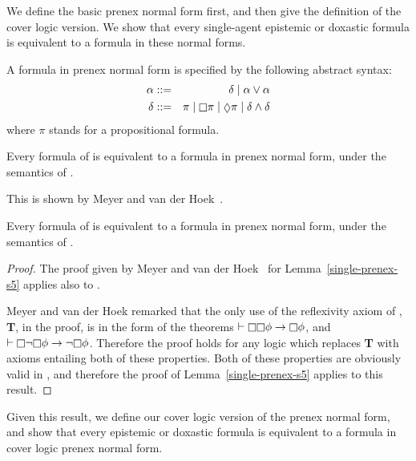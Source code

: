 We define the basic prenex normal form first, and then give the definition of
the cover logic version. We show that every single-agent epistemic or doxastic
formula is equivalent to a formula in these normal forms.

\begin{definition}
A formula in prenex normal form is specified by the following abstract syntax: 
\begin{eqnarray*}
\alpha &::=& \delta \bnfalt \alpha \lor \alpha\\
\delta &::=&    \pi \bnfalt
                \knows \pi \bnfalt
                \suspects \pi \bnfalt
                \delta \land \delta
\end{eqnarray*}
where $\pi$ stands for a propositional formula.
\end{definition}

\begin{lemma}\label{single-prenex-s5}
Every formula of \langi{} is equivalent to a formula in prenex normal form, under
the semantics of \logicSi{}.
\end{lemma}

This is shown by Meyer and van der Hoek~\cite{meyer2004epistemic}.

\begin{lemma}\label{single-prenex-kd45}
Every formula of \langi{} is equivalent to a formula in prenex normal form, under
the semantics of \logicKDi{}.
\end{lemma}

\begin{proof}
The proof given by Meyer and van der Hoek~\cite{meyer2004epistemic} for
Lemma~\ref{single-prenex-s5} applies also to \logicKDi{}.

Meyer and van der Hoek remarked that the only use of the reflexivity axiom of
\logicS{}, {\bf T}, in the proof, is in the form of the theorems $\proves \knows
\knows \phi \implies \knows \phi$, and $\proves \knows \neg \knows \phi \implies
\neg \knows \phi$. Therefore the proof holds for any logic which replaces {\bf
T} with axioms entailing both of these properties. Both of these properties are
obviously valid in \logicKDi{}, and therefore the proof of
Lemma~\ref{single-prenex-s5} applies to this result.
\end{proof}

Given this result, we define our cover logic version of the prenex normal form,
and show that every epistemic or doxastic formula is equivalent to a formula in
cover logic prenex normal form.


